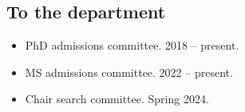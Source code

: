 \documentclass[11pt,letterpaper,sans]{moderncv}        %
\begin{document}
\subsection{To the department}
\begin{itemize}
  \item PhD admissions committee. 2018 -- present.
  \item MS admissions committee. 2022 -- present.
  \item Chair search committee. Spring 2024.
\end{itemize}
\end{document}

